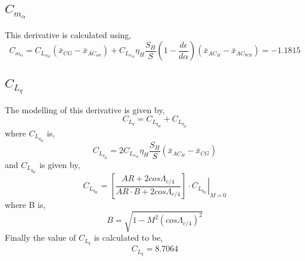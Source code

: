 \documentclass[letterpaper,12pt]{article}
\begin{document}
\subsection{$C_{m_\alpha}$}
This derivative is calculated using,
\begin{equation*}
C_{m_\alpha} = C_{L_{\alpha_W}}(\bar{x}_{CG} - \bar{x}_{AC_{wb}}) + C_{L_{\alpha_H}}\eta_H\frac{S_H}{S}\left(1 - \frac{d\epsilon}{d\alpha}\right)(\bar{x}_{AC_H} - \bar{x}_{AC_{WB}}) = -1.1815
\end{equation*}
\subsection{$C_{L_q}$}
The modelling of this derivative is given by,
\begin{equation*}
C_{L_q} = C_{L_{q_W}} + C_{L_{q_H}}
\end{equation*}
where $C_{L_{q_H}}$ is,
\begin{equation*}
C_{L_{q_H}} = 2 C_{L_{\alpha_H}} \eta_H \frac{S_H}{S}(\bar{x}_{AC_H} - \bar{x}_{CG}) 
\end{equation*}
and $C_{L_{q_W}}$ is given by,
\begin{equation*}
C_{L_{q_W}} = \left[\frac{AR + 2 cos\Lambda_{c/4}}{AR\cdot B + 2 cos\Lambda_{c/4}}\right] \cdot \left.C_{L_{q_W}}\right\vert_{M = 0}
\end{equation*}
where B is,
\begin{equation*}
B = \sqrt{1 - M^2(cos\Lambda_{c/4})^2}
\end{equation*}
Finally the value of $C_{L_q}$ is calculated to be,
\begin{equation*}
C_{L_q} = 8.7064
\end{equation*}
\end{document}
